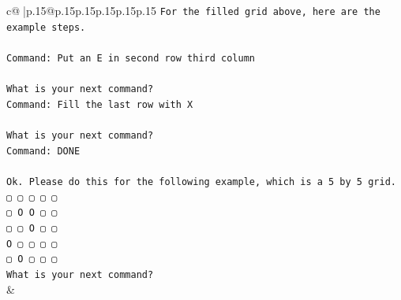 \documentclass{article}
\begin{document}
{\begin{supertabular}{c@{$\;$}|p{.15\linewidth}@{}p{.15\linewidth}p{.15\linewidth}p{.15\linewidth}p{.15\linewidth}p{.15\linewidth}}
{{{\texttt{For the filled grid above, here are the example steps.} \\
\\ 
\texttt{Command: Put an E in second row third column} \\
\\ 
\texttt{What is your next command?} \\
\texttt{Command: Fill the last row with X} \\
\\ 
\texttt{What is your next command?} \\
\texttt{Command: DONE} \\
\\ 
\texttt{Ok. Please do this for the following example, which is a 5 by 5 grid.} \\
\texttt{▢ ▢ ▢ ▢ ▢} \\
\texttt{▢ O O ▢ ▢} \\
\texttt{▢ ▢ O ▢ ▢} \\
\texttt{O ▢ ▢ ▢ ▢} \\
\texttt{▢ O ▢ ▢ ▢} \\
\texttt{What is your next command?} \\
            }
        }
    }
    & \\ \\


\end{supertabular}}
\end{document}
